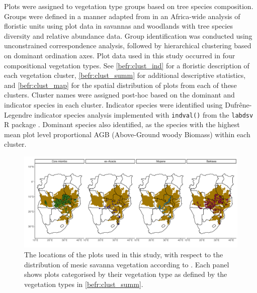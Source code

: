 \begin{refsection}
Plots were assigned to vegetation type groups based on tree species composition. Groups were defined in a manner adapted from \citet{Fayolle2018} in an Africa-wide analysis of floristic units using plot data in savannas and woodlands with tree species diversity and relative abundance data. Group identification was conducted using unconstrained correspondence analysis, followed by hierarchical clustering based on dominant ordination axes. Plot data used in this study occurred in four compositional vegetation types. See \autoref{befr:clust_ind} for a floristic description of each vegetation cluster, \autoref{befr:clust_summ} for additional descriptive statistics, and \autoref{befr:clust_map} for the spatial distribution of plots from each of these clusters. Cluster names were assigned post-hoc based on the dominant and indicator species in each cluster. Indicator species were identified using Dufr\^{e}ne-Legendre indicator species analysis \citep{Dufrene1997} implemented with \texttt{indval()} from the \texttt{labdsv} R package \citep{labdsv}. Dominant species also identified, as the species with the highest mean plot level proportional AGB (Above-Ground woody Biomass) within each cluster.





\begin{landscape}
\begin{figure}
	\includegraphics[width=\linewidth]{img/clust_map}
	\caption[Plot locations used in analysis, grouped by vegetation type]{The locations of the \nplots{} plots used in this study, with respect to the distribution of mesic savanna vegetation according to \citet{White1983}. Each panel shows plots categorised by their vegetation type as defined by the vegetation types in \autoref{befr:clust_summ}.}
	\label{befr:clust_map}
\end{figure}
\end{landscape}


\end{refsection}
